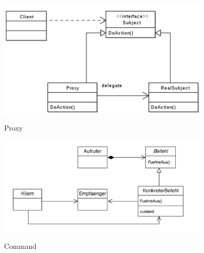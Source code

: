 \begin{figure}[htb]
	\centering
	\begin{minipage}[t]{0.45\linewidth}
		\centering
		\includegraphics[width=0.9\textwidth]{images/proxy}
		\label{fig:proxy}
		\caption{Proxy}
	\end{minipage}%
	\hfill
	\begin{minipage}[t]{0.45\linewidth}
		\centering
		\includegraphics[width=0.9\textwidth]{images/command}
		\label{fig:command}
		\caption{Command}
	\end{minipage}
\end{figure}

